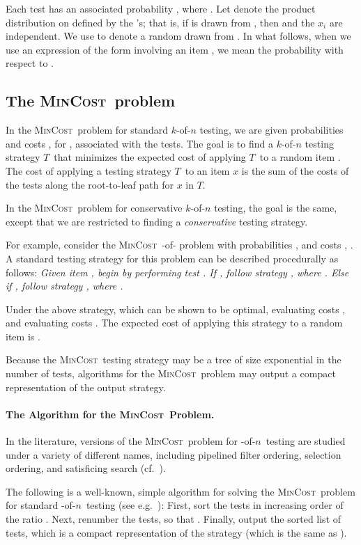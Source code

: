 \documentclass{article}
\newcounter{ass}
\newcommand{\ens}[1]{\ensuremath{#1}}					\newcommand{\card}[1]{\ens{|#1|}}							\newcommand{\dotlist}[2]{\ens{#1,\ldots,#2}}
\newcommand{\anitem}{\ens{x}}
\newcommand{\valn}{\ens{n}}
\newcommand{\valk}{\ens{k}}
\newcommand{\mincost}{\textsc{MinCost}}
\newcommand{\kofn}{\valk-of-\valn}
\newcommand{\oneofn}{-of-\valn}
\newcommand{\strategy}{\ens{T}}
\newcommand{\retval}[1]{\ens{\anitem_{#1}}}					\newcommand{\pr}[1]{\ens{p_{#1}}}									\newcommand{\qr}[1]{\ens{q_{#1}}}									\newcommand{\op}[1]{\ens{O_{#1}}}									\newcommand{\megaop}[1]{\ens{E_{#1}}}
\begin{document}
Each test  has an associated probability , where .
Let  denote the product distribution on  
defined by the 's; that is, if  is drawn from , then
 and the \retval{i} are independent.
We use  to denote a random  drawn from .
In what follows, when we use an expression of 
the form   involving 
an item , we mean the probability with respect to .


\subsection{The \mincost\ problem}
\label{sec:mincostdef}
In the \mincost\ problem for standard \kofn{} testing,
we are given  probabilities  and costs , for , associated with the tests.
The goal is to find a \kofn{} testing strategy \strategy\ that minimizes
the expected cost of applying \strategy\ to a random item .
The cost of applying a
testing strategy \strategy\ to an item
\anitem{} is the sum of the costs of the tests along the root-to-leaf 
path for \anitem{} in \strategy. 

In the \mincost\ problem for conservative \kofn{} testing, the goal is the same,
except that we are restricted to finding a {\em conservative} testing strategy.

For example, consider the \mincost\ -of- problem with probabilities ,  and costs , .
A standard testing strategy for this problem can be
described procedurally as follows: {\em Given item , begin by performing test .  
If , 
follow strategy , where .
Else if , 
follow strategy , where .}

Under the above strategy, which can be shown to be optimal,
evaluating  costs
, and
evaluating 
 costs .
The expected cost of applying this strategy to a random item  is . 



Because the \mincost\ testing strategy may be a 
tree of  size exponential in the
number of tests,  algorithms for the
\mincost\ problem may output a compact representation of the output strategy.
\paragraph{The Algorithm for the \mincost\ Problem.}

In the literature, versions of the \mincost\ problem 
for \oneofn\ testing are studied under a variety of different
names, including pipelined filter ordering, selection ordering, 
and satisficing search (cf.~\cite{journals/talg/CondonDHW09}).

The following is a well-known, simple
algorithm for solving the \mincost\ problem for standard \oneofn\ testing
(see e.g.~\cite{GAREY73}):
First, sort the
tests in increasing order of the ratio .
Next, renumber the tests, so that
.
Finally, output the sorted list  of tests, which
is a compact representation of the strategy  (which is the same as ).
\end{document}
